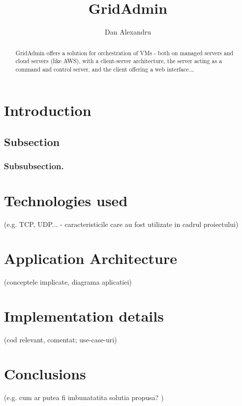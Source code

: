 \documentclass{llncs}
\begin{document}
\title{GridAdmin}
%
\author{Dan Alexandru}
%
%
%

\maketitle              %
%


%
\begin{abstract}
GridAdmin offers a solution for orchestration of VMs - both on managed servers and cloud servers (like AWS), with a client-server architecture, the server acting as a command and control server, and the client offering a web interface.\dots
{}
\end{abstract}
%

\section{Introduction}
%

%
\subsection{Subsection}
%

%
\subsubsection{Subsubsection.}
%

%
\section{Technologies used}
%
(e.g. TCP, UDP... - caracteristicile care au fost utilizate in cadrul proiectului)
%
\section{Application Architecture}
%
(conceptele implicate, diagrama aplicatiei)
%
\section{Implementation details}
%
(cod relevant, comentat; use-case-uri)
%
\section{Conclusions}
%
(e.g. cum ar putea fi imbunatatita solutia propusa? )
%
\end{document}
